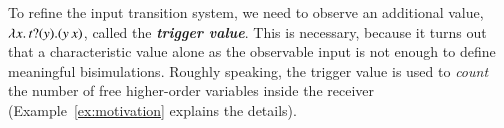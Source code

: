 To refine the input transition system, we need to observe 
an additional value, 
$\lambda {x}.\,t ? (y) . (y\, {{x}})$, 
called the {\bf\em trigger value}. 
This is necessary, because it turns out
that a characteristic value 
alone as the observable input 
is not enough to define meaningful bisimulations.
Roughly speaking, the trigger value is used 
to {\em count} the number of free higher-order variables inside 
the receiver (Example~\ref{ex:motivation} explains the details). 

